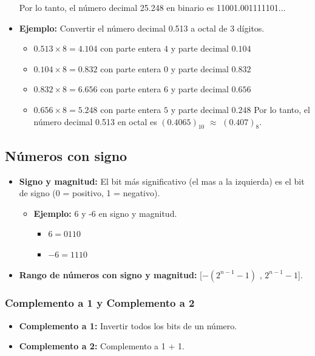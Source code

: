 \documentclass{templateNote}
\begin{document}
\begin{itemize}
\begin{itemize}
    \end{itemize}
    Por lo tanto, el número decimal 25.248 en binario es 11001.001111101...
    \item \textbf{Ejemplo:} Convertir el número decimal 0.513 a octal de 3 dígitos.
    \begin{itemize}
        \item $0.513 \times 8 = 4.104$ con parte entera $4$ y parte decimal $0.104$
        \item $0.104 \times 8 = 0.832$ con parte entera $0$ y parte decimal $0.832$
        \item $0.832 \times 8 = 6.656$ con parte entera $6$ y parte decimal $0.656$
        \item $0.656 \times 8 = 5.248$ con parte entera $5$ y parte decimal $0.248$
        Por lo tanto, el número decimal 0.513 en octal es $(0.4065)_{10}$ $\approx$ $(0.407)_8$.
    \end{itemize}
\end{itemize}

\subsection{Números con signo}

\begin{itemize}
    \item \textbf{Signo y magnitud:} El bit más significativo (el mas a la izquierda) es el bit de signo (0 = positivo, 1 = negativo).
    \begin{itemize}
        \item \textbf{Ejemplo:} 6 y -6 en signo y magnitud.
        \begin{itemize}
            \item $6 = 0110$
            \item $-6 = 1110$
        \end{itemize}
    \end{itemize}
    \item \textbf{Rango de números con signo y magnitud:} [$-(2^{n-1} - 1)$ , $2^{n-1} - 1$].
\end{itemize}

\subsubsection{Complemento a 1 y Complemento a 2}
\begin{itemize}
    \item \textbf{Complemento a 1:} Invertir todos los bits de un número.
    \item \textbf{Complemento a 2:} Complemento a 1 + 1.
\end{itemize}
\end{document}
